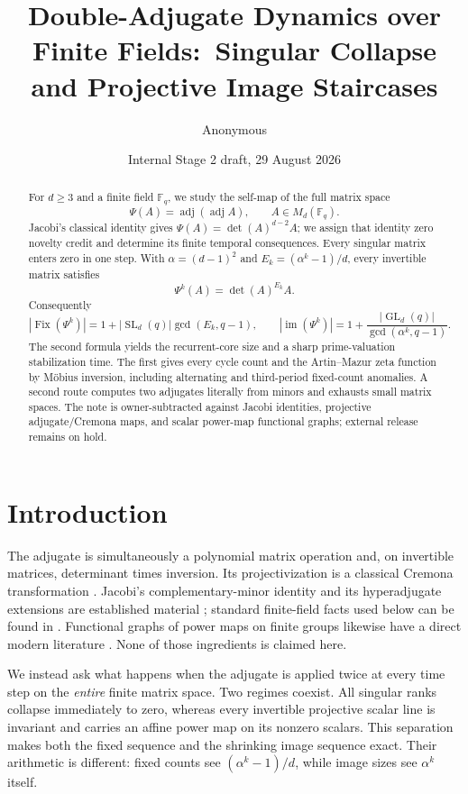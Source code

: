 \documentclass[11pt,a4paper]{amsart}
\title[Double-adjugate matrix dynamics]{Double-Adjugate Dynamics over Finite Fields:\ Singular Collapse and Projective Image Staircases}
\author{Anonymous}
\date{Internal Stage 2 draft, 29 August 2026}
\theoremstyle{definition}
\theoremstyle{remark}
\newcommand{\F}{\mathbb F}
\newcommand{\GL}{\operatorname{GL}}
\newcommand{\SL}{\operatorname{SL}}
\newcommand{\adj}{\operatorname{adj}}
\newcommand{\Fix}{\operatorname{Fix}}
\newcommand{\im}{\operatorname{im}}
\begin{document}
\begin{abstract}
For $d\ge3$ and a finite field $\F_q$, we study the self-map of the full
matrix space
\[
 \Psi(A)=\adj(\adj A),\qquad A\in M_d(\F_q).
\]
Jacobi's classical identity gives $\Psi(A)=\det(A)^{d-2}A$; we assign that
identity zero novelty credit and determine its finite temporal consequences.
Every singular matrix enters zero in one step.  With
$\alpha=(d-1)^2$ and $E_k=(\alpha^k-1)/d$, every invertible matrix satisfies
\[
 \Psi^k(A)=\det(A)^{E_k}A.
\]
Consequently
\[
 |\Fix(\Psi^k)|=1+|\SL_d(q)|\gcd(E_k,q-1),
 \qquad
 |\im(\Psi^k)|=1+\frac{|\GL_d(q)|}{\gcd(\alpha^k,q-1)}.
\]
The second formula yields the recurrent-core size and a sharp
prime-valuation stabilization time.  The first gives every cycle count and
the Artin--Mazur zeta function by M\"obius inversion, including alternating
and third-period fixed-count anomalies.  A second route computes two
adjugates literally from minors and exhausts small matrix spaces.  The note
is owner-subtracted against Jacobi identities, projective adjugate/Cremona
maps, and scalar power-map functional graphs; external release remains on
hold.
\end{abstract}

\maketitle

\section{Introduction}

The adjugate is simultaneously a polynomial matrix operation and, on
invertible matrices, determinant times inversion.  Its projectivization is
a classical Cremona transformation \cite{Dolgachev2012}.  Jacobi's complementary-minor identity
and its hyperadjugate extensions are established material
\cite{Lawrence1964}; standard finite-field facts used below can be found in
\cite{LidlNiederreiter1997}.  Functional graphs of power maps on finite
groups likewise have a direct modern literature \cite{QureshiReis2023}.
None of those ingredients is claimed here.

We instead ask what happens when the adjugate is applied twice at every
time step on the \emph{entire} finite matrix space.  Two regimes coexist.
All singular ranks collapse immediately to zero, whereas every invertible
projective scalar line is invariant and carries an affine power map on its
nonzero scalars.  This separation makes both the fixed sequence and the
shrinking image sequence exact.  Their arithmetic is different: fixed
counts see $(\alpha^k-1)/d$, while image sizes see $\alpha^k$ itself.
\end{document}
